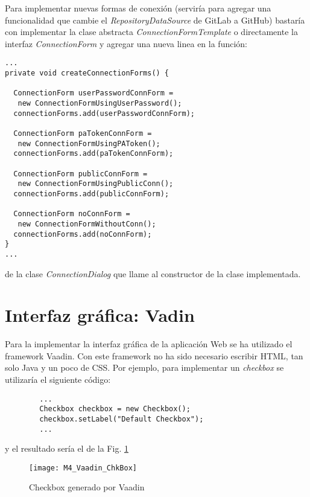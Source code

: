  Para implementar nuevas formas de conexión (serviría para agregar una funcionalidad que cambie el \textit{RepositoryDataSource} de GitLab a GitHub) bastaría con implementar la clase abstracta \textit{ConnectionFormTemplate} o directamente la interfaz \textit{ConnectionForm} y agregar una nueva linea en la función:\\
\begin{minipage}{\linewidth}
{\tiny
\begin{lstlisting}[breaklines]
...
private void createConnectionForms() {

  ConnectionForm userPasswordConnForm = 
   new ConnectionFormUsingUserPassword();
  connectionForms.add(userPasswordConnForm);

  ConnectionForm paTokenConnForm = 
   new ConnectionFormUsingPAToken();
  connectionForms.add(paTokenConnForm);

  ConnectionForm publicConnForm = 
   new ConnectionFormUsingPublicConn();
  connectionForms.add(publicConnForm);

  ConnectionForm noConnForm = 
   new ConnectionFormWithoutConn();
  connectionForms.add(noConnForm);
}
...
\end{lstlisting}
}
\end{minipage}
 de la clase \textit{ConnectionDialog} que llame al constructor de la clase implementada.
 
\section{Interfaz gráfica: Vadin}

Para la implementar la interfaz gráfica de la aplicación Web se ha utilizado el framework Vaadin. Con este framework no ha sido necesario escribir HTML, tan solo Java y un poco de CSS. Por ejemplo, para implementar un \textit{checkbox} se utilizaría el siguiente código:

\begin{minipage}{\linewidth}
	{\tiny \begin{lstlisting}
		...
		Checkbox checkbox = new Checkbox();
		checkbox.setLabel("Default Checkbox");
		...
		\end{lstlisting}}
\end{minipage}	
y el resultado sería el de la Fig. \ref{fig:M5_Vaadin_ChkBox}
\begin{figure}[!h]
	\centering
	\texttt{[image: M4\_Vaadin\_ChkBox]}
	\caption{Checkbox generado por Vaadin}\label{fig:M5_Vaadin_ChkBox}
\end{figure}
\FloatBarrier

